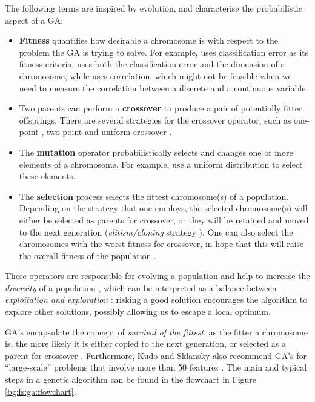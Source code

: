 \documentclass[12pt, twoside, a4paper]{report}
\begin{document}
The following terms are inspired by evolution, and characterise the probabilistic aspect of a GA:
\begin{itemize}
  \item \textbf{Fitness} quantifies how desirable a chromosome is with respect to the problem the GA is trying to solve. For example, \cite{RefWorks:204} uses classification error as its fitness criteria, \cite{RefWorks:200} uses both the classification error and the dimension of a chromosome, while \cite{RefWorks:201} uses correlation, which might not be feasible when we need to measure the correlation between a discrete and a continuous variable.
  
  \item Two parents can perform a \textbf{crossover} to produce a pair of potentially fitter offsprings. There are several strategies for the crossover operator, such as one-point \cite{RefWorks:201}, two-point \cite{RefWorks:202, RefWorks:204} and uniform crossover \cite{RefWorks:222}.
  
  \item The \textbf{mutation} operator probabilistically selects and changes one or more elements of a chromosome. For example, \cite{RefWorks:201, RefWorks:204} use a uniform distribution to select these elements.

  \item The \textbf{selection} process selects the fittest chromosome(s) of a population. Depending on the strategy that one employs, the selected chromosome(s) will either be selected as parents for crossover, or they will be retained and moved to the next generation (\textit{elitism/cloning}  strategy \cite{RefWorks:202, RefWorks:212, RefWorks:227}). One can also select the chromosomes with the worst fitness for crossover, in hope that this will raise the overall fitness of the population \cite{RefWorks:203}.
  
\end{itemize}

These operators are responsible for evolving a population and help to increase the \textit{diversity} of a population \cite{RefWorks:236}, which can be interpreted as a balance between \textit{exploitation and exploration} \cite{RefWorks:236}: risking a good solution encourages the algorithm to explore other solutions, possibly allowing us to escape a local optimum.

GA's encapsulate the concept of \textit{survival of the fittest}, as the fitter a chromosome is, the more likely it is either copied to the next generation, or selected as a parent for crossover \cite{RefWorks:209}. Furthermore, Kudo and Sklansky also recommend GA's for ``large-scale'' problems that involve more than 50 features \cite{RefWorks:210}. The main and typical steps in a genetic algorithm can be found in the flowchart in Figure \ref{bg:fs:ga:flowchart}.
\end{document}
